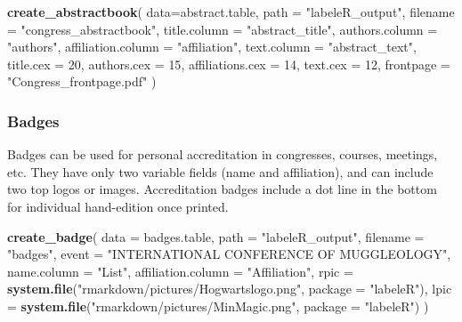 \documentclass[10pt,a4paper,onecolumn]{article}
\newenvironment{Shaded}{\begin{snugshade}}{\end{snugshade}}
\newcommand{\AttributeTok}[1]{\textcolor[rgb]{0.13,0.29,0.53}{#1}}
\newcommand{\DecValTok}[1]{\textcolor[rgb]{0.00,0.00,0.81}{#1}}
\newcommand{\FunctionTok}[1]{\textcolor[rgb]{0.13,0.29,0.53}{\textbf{#1}}}
\newcommand{\NormalTok}[1]{#1}
\newcommand{\StringTok}[1]{\textcolor[rgb]{0.31,0.60,0.02}{#1}}
\begin{document}
\begin{Shaded}
\begin{Highlighting}[]
\FunctionTok{create\_abstractbook}\NormalTok{(}
\AttributeTok{data=}\NormalTok{abstract.table,}
\AttributeTok{path =} \StringTok{"labeleR\_output"}\NormalTok{,}
\AttributeTok{filename =} \StringTok{"congress\_abstractbook"}\NormalTok{,}
\AttributeTok{title.column =} \StringTok{"abstract\_title"}\NormalTok{,}
\AttributeTok{authors.column =} \StringTok{"authors"}\NormalTok{,}
\AttributeTok{affiliation.column =} \StringTok{"affiliation"}\NormalTok{,}
\AttributeTok{text.column =} \StringTok{"abstract\_text"}\NormalTok{,}
\AttributeTok{title.cex =} \DecValTok{20}\NormalTok{,}
\AttributeTok{authors.cex =} \DecValTok{15}\NormalTok{,}
\AttributeTok{affiliations.cex =} \DecValTok{14}\NormalTok{,}
\AttributeTok{text.cex =} \DecValTok{12}\NormalTok{,}
\AttributeTok{frontpage =} \StringTok{"Congress\_frontpage.pdf"}
\NormalTok{)}
\end{Highlighting}
\end{Shaded}

\subsubsection{Badges}\label{badges}

Badges can be used for personal accreditation in congresses, courses,
meetings, etc. They have only two variable fields (name and
affiliation), and can include two top logos or images. Accreditation
badges include a dot line in the bottom for individual hand-edition once
printed.

\begin{Shaded}
\begin{Highlighting}[]
\FunctionTok{create\_badge}\NormalTok{(}
  \AttributeTok{data =}\NormalTok{ badges.table,}
  \AttributeTok{path =} \StringTok{"labeleR\_output"}\NormalTok{,}
  \AttributeTok{filename =} \StringTok{"badges"}\NormalTok{,}
  \AttributeTok{event =} \StringTok{"INTERNATIONAL CONFERENCE OF MUGGLEOLOGY"}\NormalTok{,}
  \AttributeTok{name.column =} \StringTok{"List"}\NormalTok{,}
  \AttributeTok{affiliation.column =} \StringTok{"Affiliation"}\NormalTok{,}
  \AttributeTok{rpic =} \FunctionTok{system.file}\NormalTok{(}\StringTok{"rmarkdown/pictures/Hogwartslogo.png"}\NormalTok{, }\AttributeTok{package =} \StringTok{"labeleR"}\NormalTok{),}
  \AttributeTok{lpic =} \FunctionTok{system.file}\NormalTok{(}\StringTok{"rmarkdown/pictures/MinMagic.png"}\NormalTok{, }\AttributeTok{package =} \StringTok{"labeleR"}\NormalTok{)}
\NormalTok{)}
\end{Highlighting}
\end{Shaded}
\end{document}
